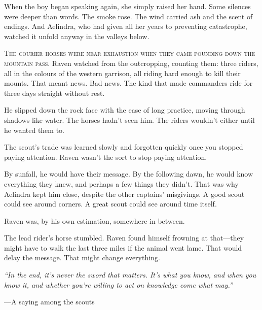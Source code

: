 \documentclass[openany,11pt]{book}
\begin{document}
When the boy began speaking again, she simply raised her hand. Some silences were deeper than words. The smoke rose. The wind carried ash and the scent of endings. And Aelindra, who had given all her years to preventing catastrophe, watched it unfold anyway in the valleys below.

\newpage




\lettrine[lines=3]{T}{he courier horses were near exhaustion when they came pounding down the mountain pass.} Raven watched from the outcropping, counting them: three riders, all in the colours of the western garrison, all riding hard enough to kill their mounts. That meant news. Bad news. The kind that made commanders ride for three days straight without rest.

He slipped down the rock face with the ease of long practice, moving through shadows like water. The horses hadn't seen him. The riders wouldn't either until he wanted them to.

The scout's trade was learned slowly and forgotten quickly once you stopped paying attention. Raven wasn't the sort to stop paying attention.

\scenebreak

By sunfall, he would have their message. By the following dawn, he would know everything they knew, and perhaps a few things they didn't. That was why Aelindra kept him close, despite the other captains' misgivings. A good scout could see around corners. A great scout could see around time itself.

Raven was, by his own estimation, somewhere in between.

The lead rider's horse stumbled. Raven found himself frowning at that—they might have to walk the last three miles if the animal went lame. That would delay the message. That might change everything.

\begin{quotebox}
  \textit{``In the end, it's never the sword that matters. It's what you know, and when you know it, and whether you're willing to act on knowledge come what may.''}
  
  \hfill—A saying among the scouts
\end{quotebox}
\end{document}
